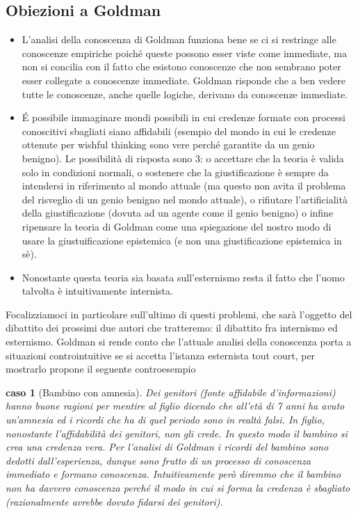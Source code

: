 \documentclass[10pt,a4paper]{article}
\newtheorem{caso}{caso}
\begin{document}
\subsection{Obiezioni a Goldman}
\begin{itemize}
	\item L'analisi della conoscenza di Goldman funziona bene se ci si restringe alle conoscenze empiriche poiché queste possono esser viste come immediate, ma non si concilia con il fatto che esistono conoscenze che non sembrano poter esser collegate a conoscenze immediate. Goldman risponde che a ben vedere tutte le conoscenze, anche quelle logiche, derivano da conoscenze immediate.
	\item \'E possibile immaginare mondi possibili in cui credenze formate con processi conoscitivi sbagliati siano affidabili (esempio del mondo in cui le credenze ottenute per wishful thinking sono vere perché garantite da un genio benigno). Le possibilità di risposta sono 3: o accettare che la teoria è valida solo in condizioni normali, o sostenere che la giustificazione è sempre da intendersi in riferimento al mondo attuale (ma questo non avita il problema del risveglio di un genio benigno nel mondo attuale), o rifiutare l'artificialità della giustificazione (dovuta ad un agente come il genio benigno) o infine ripensare la teoria di Goldman come una spiegazione del nostro modo di usare la giustuificazione epistemica (e non una giustificazione epistemica in sè).   
	\item  Nonostante questa teoria sia basata sull'esternismo resta il fatto che l'uomo talvolta è intuitivamente internista.
\end{itemize}
Focalizziamoci in particolare sull'ultimo di questi problemi, che sarà l'oggetto del dibattito dei prossimi due autori che tratteremo: il dibattito fra internismo ed esternismo. Goldman si rende conto che l'attuale analisi della conoscenza porta a situazioni controintuitive se si accetta l'istanza esternista tout court, per mostrarlo propone il seguente controesempio
\begin{caso}[Bambino con amnesia]
	Dei genitori (fonte affidabile d'informazioni) hanno buone ragioni per mentire al figlio dicendo che all'età di 7 anni ha avuto un'amnesia ed i ricordi che ha di quel periodo sono in realtà falsi. In figlio, nonostante l'affidabilità dei genitori, non gli crede. In questo modo il bambino si crea una credenza vera. Per l'analisi di Goldman i ricordi del bambino sono dedotti dall'esperienza, dunque sono frutto di un processo di conoscenza immediato e formano conoscenza. Intuitivamente però diremmo che il bambino non ha davvero conoscenza perché il modo in cui si forma la credenza è sbagliato (razionalmente avrebbe dovuto fidarsi dei genitori). 
\end{caso}
\end{document}
